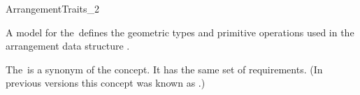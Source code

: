 
\ccRefPageBegin

\begin{ccRefConcept}{ArrangementTraits_2}

\ccDefinition
   A model for the\ccRefName\ defines the geometric types and
   primitive operations used in the arrangement data structure
   .

  The\ccRefName\ is a synonym of the
   concept. It has the same
  set of requirements. (In previous versions this concept was known as
  .)

\ccHasModels
  \\
  \\
  \\
   \\
   \\

\end{ccRefConcept}

\ccRefPageEnd
